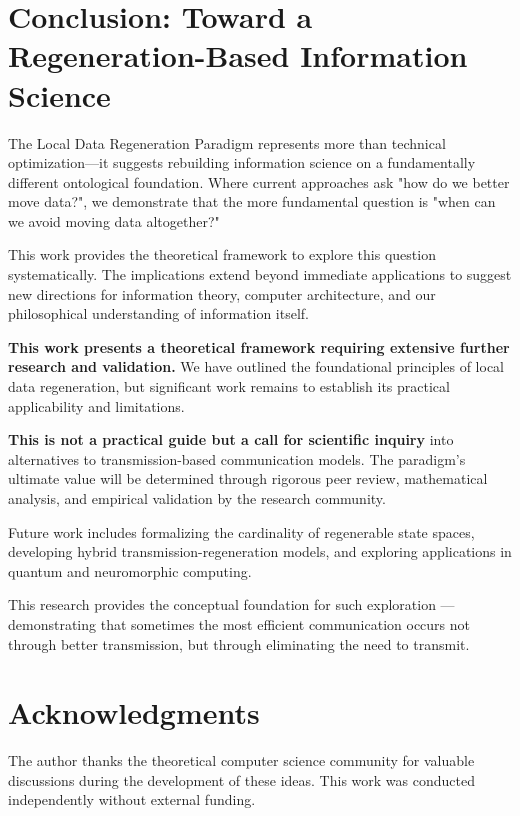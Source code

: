 \documentclass[11pt,a4paper]{article}
\begin{document}
\section{Conclusion: Toward a Regeneration-Based Information Science}

The Local Data Regeneration Paradigm represents more than technical optimization—it suggests rebuilding information science on a fundamentally different ontological foundation. Where current approaches ask "how do we better move data?", we demonstrate that the more fundamental question is "when can we avoid moving data altogether?"

This work provides the theoretical framework to explore this question systematically. The implications extend beyond immediate applications to suggest new directions for information theory, computer architecture, and our philosophical understanding of information itself.

\textbf{This work presents a theoretical framework requiring extensive further research and validation.} We have outlined the foundational principles of local data regeneration, but significant work remains to establish its practical applicability and limitations.

\textbf{This is not a practical guide but a call for scientific inquiry} into alternatives to transmission-based communication models. The paradigm's ultimate value will be determined through rigorous peer review, mathematical analysis, and empirical validation by the research community.

Future work includes formalizing the cardinality of regenerable state spaces, developing hybrid transmission-regeneration models, and exploring applications in quantum and neuromorphic computing.

This research provides the conceptual foundation for such exploration — demonstrating that sometimes the most efficient communication occurs not through better transmission, but through eliminating the need to transmit.

\section*{Acknowledgments}

The author thanks the theoretical computer science community for valuable discussions during the development of these ideas. This work was conducted independently without external funding.
\end{document}
